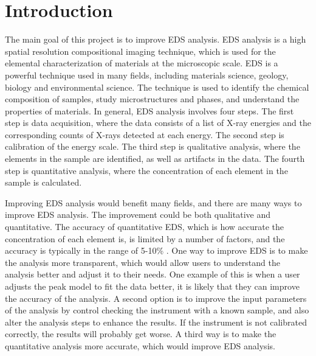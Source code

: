 \chapter{Introduction}
\label{chap:introduction}




The main goal of this project is to improve EDS analysis.
EDS analysis is a high spatial resolution compositional imaging technique, which is used for the elemental characterization of materials at the microscopic scale.
EDS is a powerful technique used in many fields, including materials science, geology, biology and environmental science.
The technique is used to identify the chemical composition of samples, study microstructures and phases, and understand the properties of materials.
In general, EDS analysis involves four steps.
The first step is data acquisition, where the data consists of a list of X-ray energies and the corresponding counts of X-rays detected at each energy.
The second step is calibration of the energy scale.
The third step is qualitative analysis, where the elements in the sample are identified, as well as artifacts in the data.
The fourth step is quantitative analysis, where the concentration of each element in the sample is calculated.



Improving EDS analysis would benefit many fields, and there are many ways to improve EDS analysis.
The improvement could be both qualitative and quantitative.
The accuracy of quantitative EDS, which is how accurate the concentration of each element is, is limited by a number of factors, and the accuracy is typically in the range of 5-10\% \cite{goldstein_scanning_2018,carter2016transmission}.
One way to improve EDS is to make the analysis more transparent, which would allow users to understand the analysis better and adjust it to their needs.
One example of this is when a user adjusts the peak model to fit the data better, it is likely that they can improve the accuracy of the analysis.
A second option is to improve the input parameters of the analysis by control checking the instrument with a known sample, and also alter the analysis steps to enhance the results.
If the instrument is not calibrated correctly, the results will probably get worse.
A third way is to make the quantitative analysis more accurate, which would improve EDS analysis.


